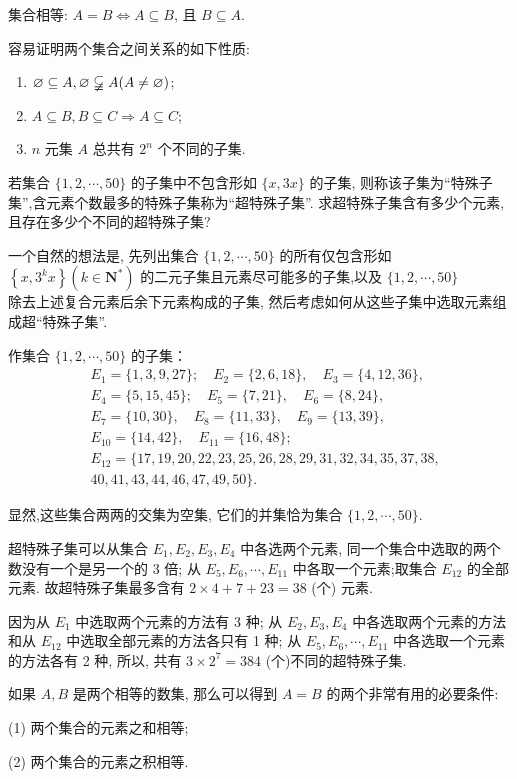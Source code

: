 集合相等: $A=B \Leftrightarrow A \subseteq B$, 且 $B \subseteq A$.

容易证明两个集合之间关系的如下性质:

\begin{enumerate}
  \item $\varnothing \subseteq A, \varnothing \varsubsetneqq A(A \neq \varnothing)$;
  \item $A \subseteq B, B \subseteq C \Rightarrow A \subseteq C$;
  \item $n$ 元集 $A$ 总共有 $2^{n}$ 个不同的子集.
\end{enumerate}
\begin{example}
若集合 $\{1,2, \cdots, 50\}$ 的子集中不包含形如 $\{x, 3 x\}$ 的子集, 则称该子集为“特殊子集”,含元素个数最多的特殊子集称为“超特殊子集”. 求超特殊子集含有多少个元素,且存在多少个不同的超特殊子集?
\end{example}

\begin{analysis}
一个自然的想法是, 先列出集合 $\{1,2, \cdots, 50\}$ 的所有仅包含形如 $\left\{x, 3^{k} x\right\}\left(k \in \mathbf{N}^{*}\right)$ 的二元子集且元素尽可能多的子集,以及 $\{1,2, \cdots, 50\}$\\
除去上述复合元素后余下元素构成的子集, 然后考虑如何从这些子集中选取元素组成超“特殊子集”.
\end{analysis}
\begin{solution}
作集合 $\{1,2, \cdots, 50\}$ 的子集：
$$
\begin{aligned}
& E_{1}=\{1,3,9,27\} ; \quad E_{2}=\{2,6,18\}, \quad E_{3}=\{4,12,36\}, \\
& E_{4}=\{5,15,45\} ; \quad E_{5}=\{7,21\}, \quad E_{6}=\{8,24\}, \\
& E_{7}=\{10,30\}, \quad E_{8}=\{11,33\}, \quad E_{9}=\{13,39\}, \\
& E_{10}=\{14,42\}, \quad E_{11}=\{16,48\} ; \\
& E_{12}=\{17,19,20,22,23,25,26,28,29,31,32,34,35,37,38, \\
&40,41,43,44,46,47,49,50\} .
\end{aligned}
$$

显然,这些集合两两的交集为空集, 它们的并集恰为集合 $\{1,2, \cdots, 50\}$.

超特殊子集可以从集合 $E_{1} ,  E_{2} ,  E_{3} ,  E_{4}$ 中各选两个元素, 同一个集合中选取的两个数没有一个是另一个的 3 倍; 从 $E_{5}, E_{6}, \cdots, E_{11}$ 中各取一个元素;取集合 $E_{12}$ 的全部元素. 故超特殊子集最多含有 $2 \times 4+7+23=38$ (个) 元素.

因为从 $E_{1}$ 中选取两个元素的方法有 3 种; 从 $E_{2} ,  E_{3} ,  E_{4}$ 中各选取两个元素的方法和从 $E_{12}$ 中选取全部元素的方法各只有 1 种; 从 $E_{5}, E_{6}, \cdots, E_{11}$ 中各选取一个元素的方法各有 2 种, 所以, 共有 $3 \times 2^{7}=384$ (个)不同的超特殊子集.

如果 $A ,  B$ 是两个相等的数集, 那么可以得到 $A=B$ 的两个非常有用的必要条件:

(1) 两个集合的元素之和相等;

(2) 两个集合的元素之积相等.
\end{solution}

